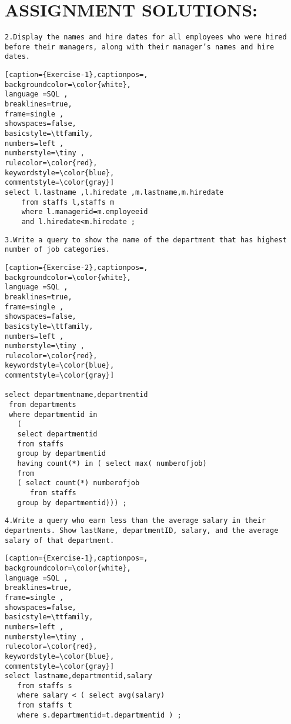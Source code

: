 \documentclass[12pt,a4paper]{article}
\begin{document}


\newpage
\section{ASSIGNMENT SOLUTIONS: }
{\tt{2.Display the names and hire dates for all employees who were hired before their managers, along 
with their manager’s names and hire dates.\\}}
\begin{lstlisting}[caption={Exercise-1},captionpos=,
backgroundcolor=\color{white},
language =SQL ,
breaklines=true,
frame=single ,
showspaces=false,
basicstyle=\ttfamily,
numbers=left ,
numberstyle=\tiny ,
rulecolor=\color{red},
keywordstyle=\color{blue},
commentstyle=\color{gray}]
select l.lastname ,l.hiredate ,m.lastname,m.hiredate
    from staffs l,staffs m
    where l.managerid=m.employeeid
    and l.hiredate<m.hiredate ;

\end{lstlisting} 

\vspace{1cm}


{\tt{3.Write a query to show the name of the department that has highest number of job categories. \\}}




\begin{lstlisting}[caption={Exercise-2},captionpos=,
backgroundcolor=\color{white},
language =SQL ,
breaklines=true,
frame=single ,
showspaces=false,
basicstyle=\ttfamily,
numbers=left ,
numberstyle=\tiny ,
rulecolor=\color{red},
keywordstyle=\color{blue},
commentstyle=\color{gray}]

select departmentname,departmentid
 from departments 
 where departmentid in
   (
   select departmentid 
   from staffs
   group by departmentid
   having count(*) in ( select max( numberofjob)
   from 
   ( select count(*) numberofjob
      from staffs 
   group by departmentid))) ;
\end{lstlisting} 




\vspace{1cm}
{\tt{4.Write a query who earn less than the average salary in their departments. Show lastName, 
departmentID, salary, and the average salary of that department. \\}}

\begin{lstlisting}[caption={Exercise-1},captionpos=,
backgroundcolor=\color{white},
language =SQL ,
breaklines=true,
frame=single ,
showspaces=false,
basicstyle=\ttfamily,
numbers=left ,
numberstyle=\tiny ,
rulecolor=\color{red},
keywordstyle=\color{blue},
commentstyle=\color{gray}]
select lastname,departmentid,salary
   from staffs s
   where salary < ( select avg(salary)
   from staffs t
   where s.departmentid=t.departmentid ) ;

\end{lstlisting} 
\end{document}
